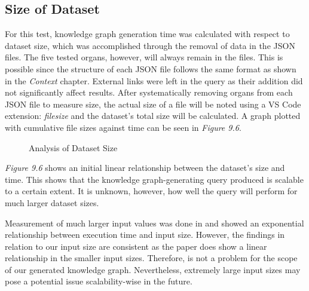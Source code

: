 \subsection{Size of Dataset}
\hspace{0.5cm} For this test, knowledge graph generation time was calculated with respect to dataset size, which was accomplished through the removal of data in the JSON files. The five tested organs, however, will always remain in the files. This is possible since the structure of each JSON file follows the same format as shown in the \textit{Context} chapter. External links were left in the query as their addition did not significantly affect results. After systematically removing organs from each JSON file to measure size, the actual size of a file will be noted using a VS Code extension: \textit{filesize} and the dataset's total size will be calculated. A graph plotted with cumulative file sizes against time can be seen in \textit{Figure 9.6}.

\begin{figure}[H]
\begin{center}
\end{center}
\vspace{-0.75cm}
\caption{Analysis of Dataset Size}
\end{figure}

\textit{Figure 9.6} shows an initial linear relationship between the dataset's size and time. This shows that the knowledge graph-generating query produced is scalable to a certain extent. It is unknown, however, how well the query will perform for much larger dataset sizes. 

Measurement of much larger input values was done in \cite{sparqlanything} and showed an exponential relationship between execution time and input size. However, the findings in relation to our input size are consistent as the paper does show a linear relationship in the smaller input sizes. Therefore, is not a problem for the scope of our generated knowledge graph. Nevertheless, extremely large input sizes may pose a potential issue scalability-wise in the future.

